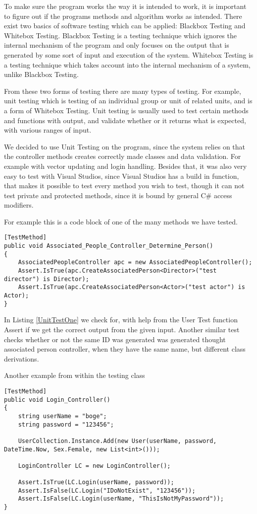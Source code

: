 To make sure the program works the way it is intended to work, it is important to figure out if the programs methods and algorithm works as intended. There exist two basics of software testing which can be applied: Blackbox Testing and Whitebox Testing. Blackbox Testing is a testing technique which ignores the internal mechanism of the program and only focuses on the output that is generated by some sort of input and execution of the system. Whitebox Testing is a testing technique which takes account into the internal mechanism of a system, unlike Blackbox Testing.

From these two forms of testing there are many types of testing. For example, unit testing which is testing of an individual group or unit of related units, and is a form of Whitebox Testing. Unit testing is usually used to test certain methods and functions with output, and validate whether or it returns what is expected, with various ranges of input. \cite{Testing}

We decided to use Unit Testing on the program, since the system relies on that the controller methods creates correctly made classes and data validation. For example with vector updating and login handling. Besides that, it was also very easy to test with Visual Studios, since Visual Studios has a build in function, that makes it possible to test every method you wish to test, though it can not test private and protected methods, since it is bound by general C\# access modifiers.

For example this is a code block of one of the many methods we have tested.

\begin{lstlisting}[caption={A unit test which tests the associated person controller},label={UnitTestOne}]
[TestMethod]
public void Associated_People_Controller_Determine_Person()
{
	AssociatedPeopleController apc = new AssociatedPeopleController();
	Assert.IsTrue(apc.CreateAssociatedPerson<Director>("test director") is Director);
	Assert.IsTrue(apc.CreateAssociatedPerson<Actor>("test actor") is Actor);
}
\end{lstlisting}

In Listing \ref{UnitTestOne} we check for, with help from the User Test function Assert if we get the correct output from the given input. Another similar test checks whether or not the same ID was generated was generated thought associated person controller, when they have the same name, but different class derivations.

Another example from within the testing class
\begin{lstlisting}[caption={A unit test which tests the login controller},label={UnitTestTwo}]
[TestMethod] 
public void Login_Controller()
{
	string userName = "boge";
	string password = "123456";

	UserCollection.Instance.Add(new User(userName, password, DateTime.Now, Sex.Female, new List<int>()));

	LoginController LC = new LoginController();

	Assert.IsTrue(LC.Login(userName, password));
	Assert.IsFalse(LC.Login("IDoNotExist", "123456"));
	Assert.IsFalse(LC.Login(userName, "ThisIsNotMyPassword"));
}
\end{lstlisting}


